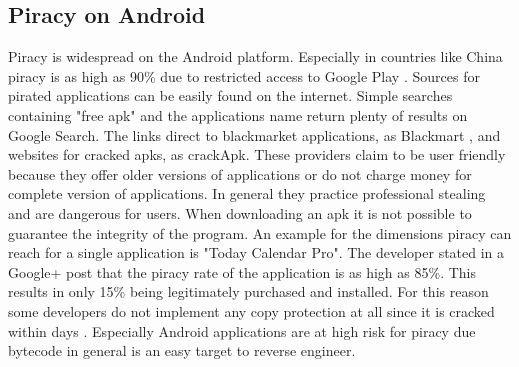 \subsection{Piracy on Android }\label{subsection:foundation-piracy-android}
Piracy is widespread on the Android platform. Especially in countries like China piracy is as high as 90\% due to restricted access to Google Play \cite{piracyRate}.
Sources for pirated applications can be easily found on the internet.
Simple searches containing "free apk" and the applications name return plenty of results on Google Search.
The links direct to blackmarket applications, as Blackmart \cite{blackmartStore}, and websites for cracked \gls{apk}s, as crackApk\cite{crackApk}.
These providers claim to be user friendly because they offer older versions of applications or do not charge money for complete version of applications.
In general they practice professional stealing and are dangerous for users.
When downloading an \gls{apk} it is not possible to guarantee the integrity of the program.
\newline
An example for the dimensions piracy can reach for a single application is "Today Calendar Pro".
The developer stated in a Google+ post that the piracy rate of the application is as high as 85\%.
This results in only 15\% being legitimately purchased and installed. \cite{xdaPiracy}\cite{developersPiracy}
\newline
For this reason some developers do not implement any copy protection at all since it is cracked within days \cite{recodeMonument}.
Especially Android applications are at high risk for piracy due bytecode in general is an easy target to reverse engineer.


%




%


